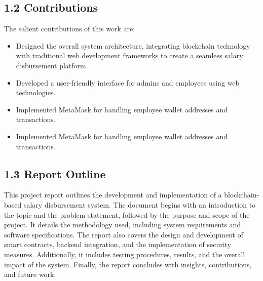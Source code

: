 \documentclass[12pt]{report}
\begin{document}
\subsection*{1.2 Contributions}
\begin{center}
    \justify
The salient contributions of this work are:
\begin{itemize}
	\setlength\itemsep{0.15em}
\item
Designed the overall system architecture, integrating blockchain technology with traditional web development frameworks to create a seamless salary disbursement platform.

\item  
Developed a user-friendly interface for admins and employees using web technologies.
\item
Implemented MetaMask for handling employee wallet addresses and transactions.
\item
Implemented MetaMask for handling employee wallet addresses and transactions.	
 \end{itemize}
 \end{center}
 \vspace{0.7em}
\subsection*{1.3 Report Outline}
\begin{center}    
    \justify
This project report outlines the development and implementation of a blockchain-based salary disbursement system. The document begins with an introduction to the topic and the problem statement, followed by the purpose and scope of the project. It details the methodology used, including system requirements and software specifications. The report also covers the design and development of smart contracts, backend integration, and the implementation of security measures. Additionally, it includes testing procedures, results, and the overall impact of the system. Finally, the report concludes with insights, contributions, and future work.

\end{center}
\newpage
\end{document}
